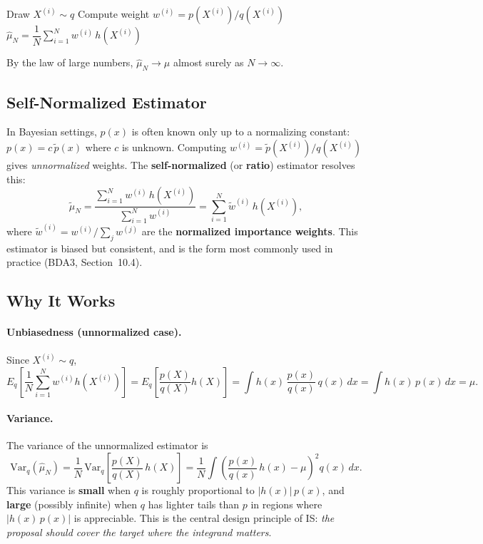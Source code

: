 \documentclass[11pt]{article}
\begin{document}
\begin{algorithm}[H]
\caption{Importance Sampling (unnormalized)}
\label{alg:is-unnorm}
\begin{algorithmic}[1]
  \State Draw $X^{(i)} \sim q$
  \State Compute weight $w^{(i)} = p(X^{(i)}) / q(X^{(i)})$
\EndFor
\State \Return $\hat{\mu}_N = \dfrac{1}{N}\displaystyle\sum_{i=1}^{N} w^{(i)}\,h(X^{(i)})$
\end{algorithmic}
\end{algorithm}

By the law of large numbers, $\hat{\mu}_N \to \mu$ almost surely as $N \to \infty$.

\subsection{Self-Normalized Estimator}

In Bayesian settings, $p(x)$ is often known only up to a normalizing constant: $p(x) = c\,\tilde{p}(x)$ where $c$ is unknown.  Computing $w^{(i)} = \tilde{p}(X^{(i)})/q(X^{(i)})$ gives \emph{unnormalized} weights.  The \textbf{self-normalized} (or \textbf{ratio}) estimator resolves this:
\[
  \tilde{\mu}_N = \frac{\sum_{i=1}^{N} w^{(i)}\,h(X^{(i)})}{\sum_{i=1}^{N} w^{(i)}}
               = \sum_{i=1}^{N} \tilde{w}^{(i)}\,h(X^{(i)}),
\]
where $\tilde{w}^{(i)} = w^{(i)} / \sum_j w^{(j)}$ are the \textbf{normalized importance weights}.  This estimator is biased but consistent, and is the form most commonly used in practice (BDA3, Section~10.4).

\subsection{Why It Works}

\paragraph{Unbiasedness (unnormalized case).}
Since $X^{(i)} \sim q$,
\[
  E_q\!\left[\frac{1}{N}\sum_{i=1}^N w^{(i)} h(X^{(i)})\right]
  = E_q\!\left[\frac{p(X)}{q(X)} h(X)\right]
  = \int h(x)\,\frac{p(x)}{q(x)}\,q(x)\,dx
  = \int h(x)\,p(x)\,dx
  = \mu.
\]

\paragraph{Variance.}
The variance of the unnormalized estimator is
\[
  \mathrm{Var}_q(\hat{\mu}_N) = \frac{1}{N}\,\mathrm{Var}_q\!\left[\frac{p(X)}{q(X)}\,h(X)\right]
  = \frac{1}{N}\int \left(\frac{p(x)}{q(x)}\,h(x) - \mu\right)^{\!2} q(x)\,dx.
\]
This variance is \textbf{small} when $q$ is roughly proportional to $|h(x)|\,p(x)$, and \textbf{large} (possibly infinite) when $q$ has lighter tails than $p$ in regions where $|h(x)\,p(x)|$ is appreciable.  This is the central design principle of IS: \emph{the proposal should cover the target where the integrand matters}.
\end{document}
